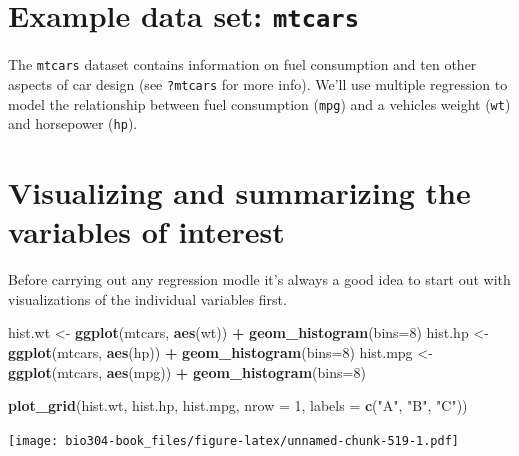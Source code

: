 \documentclass[]{book}
\newenvironment{Shaded}{\begin{snugshade}}{\end{snugshade}}
\newcommand{\DataTypeTok}[1]{\textcolor[rgb]{0.13,0.29,0.53}{#1}}
\newcommand{\DecValTok}[1]{\textcolor[rgb]{0.00,0.00,0.81}{#1}}
\newcommand{\KeywordTok}[1]{\textcolor[rgb]{0.13,0.29,0.53}{\textbf{#1}}}
\newcommand{\NormalTok}[1]{#1}
\newcommand{\OperatorTok}[1]{\textcolor[rgb]{0.81,0.36,0.00}{\textbf{#1}}}
\newcommand{\StringTok}[1]{\textcolor[rgb]{0.31,0.60,0.02}{#1}}
\theoremstyle{definition}
\theoremstyle{definition}
\theoremstyle{definition}
\theoremstyle{remark}
\begin{document}
\hypertarget{example-data-set-mtcars}{%
\section{\texorpdfstring{Example data set:
\texttt{mtcars}}{Example data set: mtcars}}\label{example-data-set-mtcars}}

The \texttt{mtcars} dataset contains information on fuel consumption and
ten other aspects of car design (see \texttt{?mtcars} for more info).
We'll use multiple regression to model the relationship between fuel
consumption (\texttt{mpg}) and a vehicles weight (\texttt{wt}) and
horsepower (\texttt{hp}).

\hypertarget{visualizing-and-summarizing-the-variables-of-interest}{%
\section{Visualizing and summarizing the variables of
interest}\label{visualizing-and-summarizing-the-variables-of-interest}}

Before carrying out any regression modle it's always a good idea to
start out with visualizations of the individual variables first.

\begin{Shaded}
\begin{Highlighting}[]
\NormalTok{hist.wt <-}\StringTok{ }\KeywordTok{ggplot}\NormalTok{(mtcars, }\KeywordTok{aes}\NormalTok{(wt)) }\OperatorTok{+}\StringTok{ }\KeywordTok{geom_histogram}\NormalTok{(}\DataTypeTok{bins=}\DecValTok{8}\NormalTok{)}
\NormalTok{hist.hp <-}\StringTok{ }\KeywordTok{ggplot}\NormalTok{(mtcars, }\KeywordTok{aes}\NormalTok{(hp)) }\OperatorTok{+}\StringTok{ }\KeywordTok{geom_histogram}\NormalTok{(}\DataTypeTok{bins=}\DecValTok{8}\NormalTok{)}
\NormalTok{hist.mpg <-}\StringTok{ }\KeywordTok{ggplot}\NormalTok{(mtcars, }\KeywordTok{aes}\NormalTok{(mpg)) }\OperatorTok{+}\StringTok{ }\KeywordTok{geom_histogram}\NormalTok{(}\DataTypeTok{bins=}\DecValTok{8}\NormalTok{)}

\KeywordTok{plot_grid}\NormalTok{(hist.wt, hist.hp, hist.mpg, }\DataTypeTok{nrow =} \DecValTok{1}\NormalTok{, }\DataTypeTok{labels =} \KeywordTok{c}\NormalTok{(}\StringTok{"A"}\NormalTok{, }\StringTok{"B"}\NormalTok{, }\StringTok{"C"}\NormalTok{))}
\end{Highlighting}
\end{Shaded}

\texttt{[image: bio304-book\_files/figure-latex/unnamed-chunk-519-1.pdf]}
\end{document}
